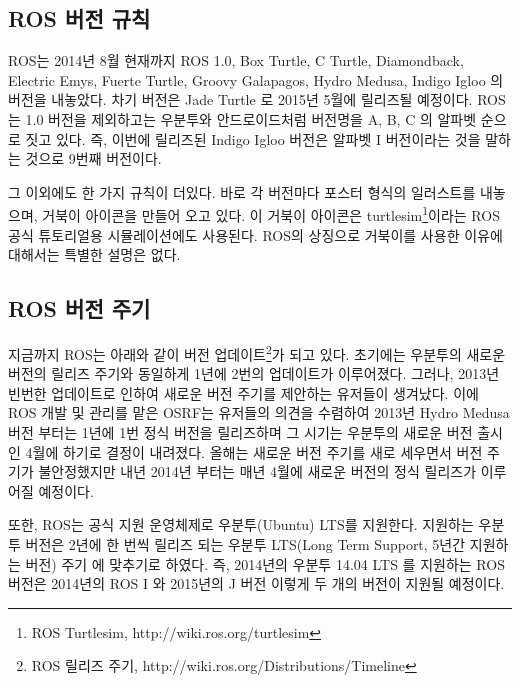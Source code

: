 \subsection{ROS 버전 규칙}

ROS는 2014년 8월 현재까지 ROS 1.0, Box Turtle, C Turtle, Diamondback, Electric Emys, Fuerte Turtle, Groovy Galapagos, Hydro Medusa, Indigo Igloo 의 버전을 내놓았다. 차기 버전은 Jade Turtle 로 2015년 5월에 릴리즈될 예정이다. ROS는 1.0 버전을 제외하고는 우분투와 안드로이드처럼 버전명을 A, B, C 의 알파벳 순으로 짓고 있다. 즉, 이번에 릴리즈된 Indigo Igloo 버전은 알파벳 I 버전이라는 것을 말하는 것으로 9번째 버전이다.

그 이외에도 한 가지 규칙이 더있다. 바로 각 버전마다 포스터 형식의 일러스트를 내놓으며, 거북이 아이콘을 만들어 오고 있다. 이 거북이 아이콘은 turtlesim\footnote{ROS Turtlesim, http://wiki.ros.org/turtlesim}이라는 ROS 공식 튜토리얼용 시뮬레이션에도 사용된다. ROS의 상징으로 거북이를 사용한 이유에 대해서는 특별한 설명은 없다.

\subsection{ROS 버전 주기}

지금까지 ROS는 아래와 같이 버전 업데이트\footnote{ROS 릴리즈 주기, http://wiki.ros.org/Distributions/Timeline}가 되고 있다. 초기에는 우분투의 새로운 버전의 릴리즈 주기와 동일하게 1년에 2번의 업데이트가 이루어졌다. 그러나, 2013년 빈번한 업데이트로 인하여 새로운 버전 주기를 제안하는 유저들이 생겨났다. 이에 ROS 개발 및 관리를 맡은 OSRF는 유저들의 의견을 수렴하여 2013년 Hydro Medusa 버전 부터는 1년에 1번 정식 버전을 릴리즈하며 그 시기는 우분투의 새로운 버전 출시인 4월에 하기로 결정이 내려졌다. 올해는 새로운 버전 주기를 새로 세우면서 버전 주기가 불안정했지만 내년 2014년 부터는 매년 4월에 새로운 버전의 정식 릴리즈가 이루어질 예정이다.

또한, ROS는 공식 지원 운영체제로 우분투(Ubuntu) LTS를 지원한다. 지원하는 우분투 버전은 2년에 한 번씩 릴리즈 되는 우분투 LTS(Long Term Support, 5년간 지원하는 버전) 주기 에 맞추기로 하였다. 즉, 2014년의 우분투 14.04 LTS 를 지원하는 ROS 버전은 2014년의 ROS I 와 2015년의 J 버전 이렇게 두 개의 버전이 지원될 예정이다.

